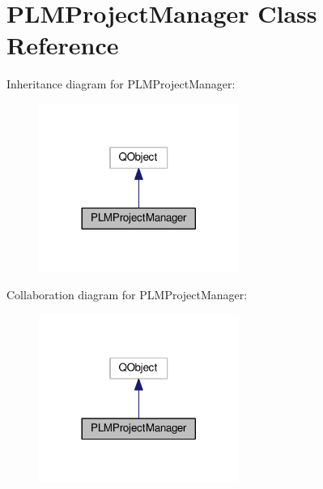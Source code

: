 \hypertarget{class_p_l_m_project_manager}{}\section{P\+L\+M\+Project\+Manager Class Reference}
\label{class_p_l_m_project_manager}


Inheritance diagram for P\+L\+M\+Project\+Manager\+:\nopagebreak
\begin{figure}[H]
\begin{center}
\leavevmode
\includegraphics[width=185pt]{class_p_l_m_project_manager__inherit__graph}
\end{center}
\end{figure}


Collaboration diagram for P\+L\+M\+Project\+Manager\+:\nopagebreak
\begin{figure}[H]
\begin{center}
\leavevmode
\includegraphics[width=185pt]{class_p_l_m_project_manager__coll__graph}
\end{center}
\end{figure}
